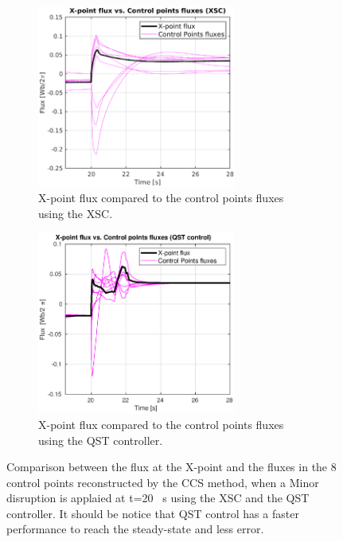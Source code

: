 \begin{figure}[h]
	\centering
	\begin{subfigure}[b]{0.32\textwidth}
		\includegraphics[height=6cm] {Chp3/Results_iso/8_gaps_XpointVSpoinsFlux_mnr_dsrp.eps}  
		\caption{ X-point flux compared to the control points fluxes using the XSC.
			\label{XpointVScntrlpointsXSC} }
	\end{subfigure}
	\hspace{2 cm}
	\begin{subfigure}[b]{0.32\textwidth}
		\includegraphics[height=6cm] {Chp3/Results_iso/8_gaps_Xpoint_flux_comparFBC.eps}  
		\caption{ X-point flux compared to the control points fluxes using the QST controller.
			\label{XpointVScntrlpointsFBC} }
	\end{subfigure}
\caption{Comparison between the flux at the X-point and the fluxes in the 8 control points reconstructed by the CCS method, when a Minor disruption is applaied at t=20 ~s using the XSC and the QST controller. It should be notice that QST control has a faster performance to reach the steady-state and less error. } \label{XpointFluxes}
\end{figure}


